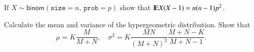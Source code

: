 \documentclass[captions=tableheading]{scrbook}
\begin{document}
\begin{xca}
\label{xca:binom-factorial-expectation}
If \(X\sim\mathsf{binom}(\mathtt{size}=n,\,\mathtt{prob}=p)\) show that \(\mathrm{I\hspace{-1.5pt}E} X(X-1)=n(n-1)p^{2}\).
\end{xca}

\begin{xca}
\label{xca:hyper-mean-variance}
Calculate the mean and variance of the hypergeometric distribution. Show that 
\begin{equation}
\mu=K\frac{M}{M+N},\quad\sigma^{2}=K\frac{MN}{(M+N)^{2}}\frac{M+N-K}{M+N-1}.
\end{equation}
\end{xca}
\end{document}

